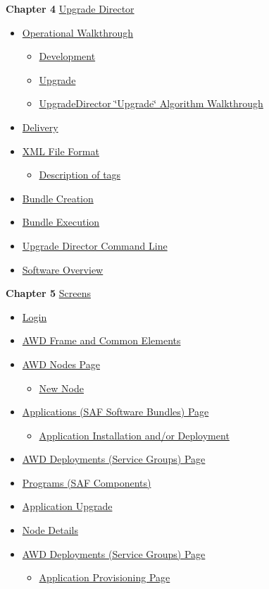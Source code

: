 {\bf Chapter 4} \hyperlink{ardguide_sec_4}{Upgrade Director}\begin{itemize}
\item \hyperlink{ardguide_sec_4_1}{Operational Walkthrough}\begin{itemize}
\item \hyperlink{ardguide_sec_4_1_ardguide_sec_4_1_1}{Development}\item \hyperlink{ardguide_sec_4_1_ardguide_sec_4_1_2}{Upgrade}\item \hyperlink{ardguide_sec_4_1_ardguide_sec_4_1_3}{UpgradeDirector \char`\"{}Upgrade\char`\"{} Algorithm Walkthrough}\end{itemize}
\item \hyperlink{ardguide_sec_4_2}{Delivery}\item \hyperlink{ardguide_sec_4_3}{XML File Format}\begin{itemize}
\item \hyperlink{ardguide_sec_4_3_ardguide_sec_4_3_1}{Description of tags}\end{itemize}
\item \hyperlink{ardguide_sec_4_4}{Bundle Creation}\item \hyperlink{ardguide_sec_4_5}{Bundle Execution}\item \hyperlink{ardguide_sec_4_6}{Upgrade Director Command Line}\item \hyperlink{ardguide_sec_4_7}{Software Overview}\end{itemize}


{\bf Chapter 5} \hyperlink{ardguide_sec_5}{Screens}\begin{itemize}
\item \hyperlink{ardguide_sec_5_1}{Login}\item \hyperlink{ardguide_sec_5_2}{AWD Frame and Common Elements}\item \hyperlink{ardguide_sec_5_3}{AWD Nodes Page}\begin{itemize}
\item \hyperlink{ardguide_sec_5_3_ardguide_sec_5_3_0_1}{New Node}\end{itemize}
\item \hyperlink{ardguide_sec_5_4}{Applications (SAF Software Bundles) Page}\begin{itemize}
\item \hyperlink{ardguide_sec_5_4_ardguide_sec_5_4_0_1}{Application Installation and/or Deployment}\end{itemize}
\item \hyperlink{ardguide_sec_5_5}{AWD Deployments (Service Groups) Page}\item \hyperlink{ardguide_sec_5_6}{Programs (SAF Components)}\item \hyperlink{ardguide_sec_5_7}{Application Upgrade}\item \hyperlink{ardguide_sec_5_8}{Node Details}\item \hyperlink{ardguide_sec_5_9}{AWD Deployments (Service Groups) Page}\begin{itemize}
\item \hyperlink{ardguide_sec_5_9_ardguide_sec_5_9_0_1}{Application Provisioning Page}\end{itemize}
\end{itemize}



